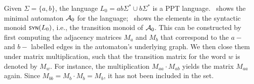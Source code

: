\begin{example}\label{ex:syntactic-monoid}
	Given $\Sigma = \{a,b\}$, the language $L_0 = ab\Sigma^* \cup b\Sigma^*$ is a PPT language.~ shows the minimal automaton $\cal A_0$ for the language;~ shows the elements in the syntactic monoid $\synmon{L_0}$, i.e., the transition monoid of $\cal A_0$. This can be constructed by first computing the adjacency matrices $M_a$ and $M_b$ that correspond to the $a-$ and $b-$ labelled edges in the automaton's underlying graph. We then close them under matrix multiplication, such that the transition matrix for the word $w$ is denoted by $M_w$. For instance, the multiplication $M_{aa}\cdot M_{ab}$ yields the matrix $M_{aa}$ again. Since $M_{bb} = M_b\cdot M_b = M_b$, it has not been included in the set.
	\begin{figure}
		\centering
\end{figure}
\end{example}

